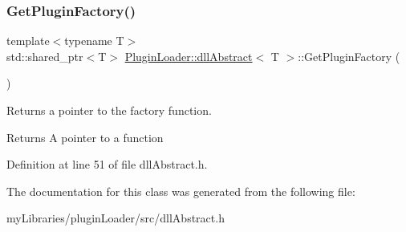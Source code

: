 \subsubsection{\texorpdfstring{GetPluginFactory()}{GetPluginFactory()}}
{\footnotesize\ttfamily template$<$typename T$>$ \\
std\+::shared\+\_\+ptr$<$T$>$ \mbox{\hyperlink{classPluginLoader_1_1dllAbstract}{Plugin\+Loader\+::dll\+Abstract}}$<$ T $>$\+::Get\+Plugin\+Factory (\begin{DoxyParamCaption}{ }\end{DoxyParamCaption})\hspace{0.3cm}{\ttfamily [inline]}}



Returns a pointer to the factory function. 

\begin{DoxyReturn}{Returns}
A pointer to a function 
\end{DoxyReturn}


Definition at line 51 of file dll\+Abstract.\+h.



The documentation for this class was generated from the following file\+:\begin{DoxyCompactItemize}
\item 
my\+Libraries/plugin\+Loader/src/dll\+Abstract.\+h\end{DoxyCompactItemize}
